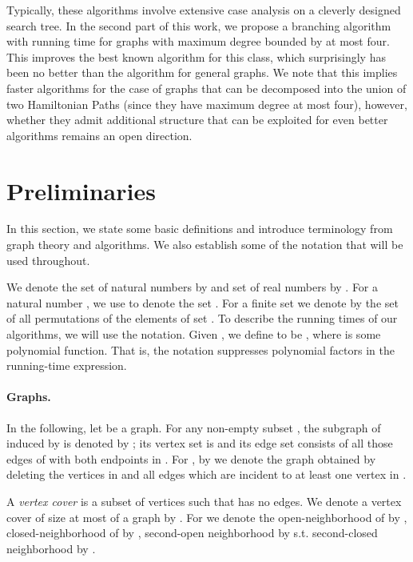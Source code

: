 \documentclass[svgnames]{llncs}
\begin{document}
Typically, these algorithms involve extensive case analysis on a cleverly designed search tree. In the second part of this work, we propose a branching algorithm with running time  for graphs with maximum degree bounded by at most four. This improves the best known algorithm for this class, which surprisingly has been no better than the algorithm for general graphs. We note that this implies faster algorithms for the case of graphs that can be decomposed into the union of two Hamiltonian Paths (since they have maximum degree at most four), however, whether they admit additional structure that can be exploited for even better algorithms remains an open direction.





\section{Preliminaries}

In this section, we state some basic definitions and introduce terminology from graph theory and algorithms. We also establish some of the notation that will be used throughout. 

We denote the set of natural numbers by  and set of real numbers by  . 
For a natural number , we use  to denote the set . For a finite set  we denote by  the set of all permutations of the elements of set . To describe the running times of our algorithms, we will use the  notation. Given , we define  to be , where  is some polynomial
function. That is, the  notation suppresses polynomial
factors in the running-time expression. 



\paragraph{Graphs.} In the following, let  be a graph. For any non-empty subset , the subgraph of  induced
by  is denoted by ; its vertex set is  and its edge set consists of all those edges of  with both endpoints in .
For , by  we denote the graph obtained by deleting the vertices in  and all edges which are incident to at least one vertex in .

A \emph{vertex cover} is a subset of vertices  such that  has no edges. We denote a vertex cover of size at most  of a graph 
 by . For  we denote the open-neighborhood of  by ,
closed-neighborhood of  by , second-open neighborhood by  s.t. 
second-closed neighborhood by .
\end{document}
